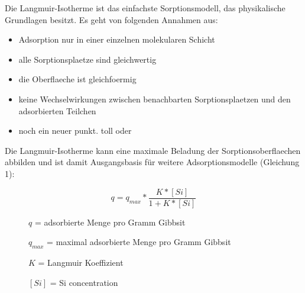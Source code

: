 Die Langmuir-Isotherme ist das einfachste Sorptionsmodell, das physikalische Grundlagen besitzt. 
Es geht von folgenden Annahmen aus:


\begin{itemize}
\item Adsorption nur in einer einzelnen molekularen Schicht
\item alle Sorptionsplaetze sind gleichwertig
\item die Oberflaeche ist gleichfoermig 
\item keine Wechselwirkungen zwischen benachbarten Sorptionsplaetzen und den adsorbierten Teilchen
\item noch ein neuer punkt. toll oder 
\end{itemize}


Die Langmuir-Isotherme kann eine maximale Beladung der Sorptionsoberflaechen abbilden und ist damit Ausgangsbasis für weitere Adsorptionsmodelle (Gleichung 1):


\begin{equation}
q=q_{max}*\frac{K*[Si]}{1+K*[Si]}
\end{equation}


\begin{description}
\item[ ] $q$ = adsorbierte Menge pro Gramm Gibbsit
\item[ ] $q_{max}$ = maximal adsorbierte Menge pro Gramm Gibbsit
\item[ ]$K$ = Langmuir Koeffizient	
\item[ ]$[Si]$ = Si concentration
\end{description}
